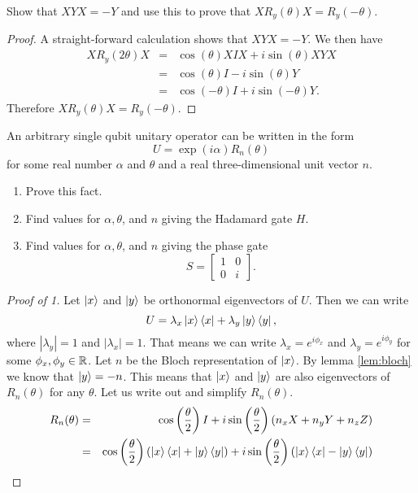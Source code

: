 \documentclass{article}
\begin{document}
\begin{exercise}
  Show that $XYX=-Y$ and use this to prove that $XR_y(\theta)X=R_y(-\theta)$.
  \begin{proof}
    A straight-forward calculation shows that $XYX=-Y$. We then have
    \begin{eqnarray*}
      XR_y(2\theta)X&=&
      \cos(\theta)XIX+i\sin(\theta)XYX \\
      &=&\cos(\theta)I-i\sin(\theta)Y \\
      &=&\cos(-\theta)I+i\sin(-\theta)Y.
    \end{eqnarray*}
    Therefore $XR_y(\theta)X=R_y(-\theta)$.
  \end{proof}
\end{exercise}

\begin{exercise}
  An arbitrary single qubit unitary operator can be written in the form
  \[U=\exp(i\alpha)R_n(\theta)\]
  for some real number $\alpha$ and $\theta$ and a real three-dimensional unit vector $n$.
  \begin{enumerate}
    \item Prove this fact.
    \item Find values for $\alpha,\theta$, and $n$ giving the Hadamard gate $H$.
    \item Find values for $\alpha,\theta$, and $n$ giving the phase gate
    \[S=\begin{bmatrix}
      1&0\\
      0&i
    \end{bmatrix}.\]
  \end{enumerate}
  \begin{proof}[Proof of 1]
    Let $\ket{x}$ and $\ket{y}$ be orthonormal eigenvectors of $U$. Then we can write
    \[U=\lambda_x\ket{x}\bra{x}+\lambda_y\ket{y}\bra{y},\]
    where $|\lambda_y|=1$ and $|\lambda_x|=1$. That means we can write $\lambda_x=e^{i\phi_x}$ and $\lambda_y=e^{i\phi_y}$ for some $\phi_x,\phi_y\in\mathbb{R}$. Let $n$ be the Bloch representation of $\ket{x}$. By lemma \ref{lem:bloch} we know that $\ket{y}=-n$. This means that $\ket{x}$ and $\ket{y}$ are also eigenvectors of $R_n(\theta)$ for any $\theta$. Let us write out and simplify $R_n(\theta)$.
    \begin{eqnarray*}
      R_n(\theta)&=&\cos\left(\frac{\theta}{2}\right)I+i\sin\left(\frac{\theta}{2}\right)(n_xX+n_yY+n_zZ) \\
      &=& \cos\left(\frac{\theta}{2}\right)(\ket{x}\bra{x}+\ket{y}\bra{y})+i\sin\left(\frac{\theta}{2}\right)(\ket{x}\bra{x}-\ket{y}\bra{y}) \\

\end{eqnarray*}
\end{proof}
\end{exercise}
\end{document}
